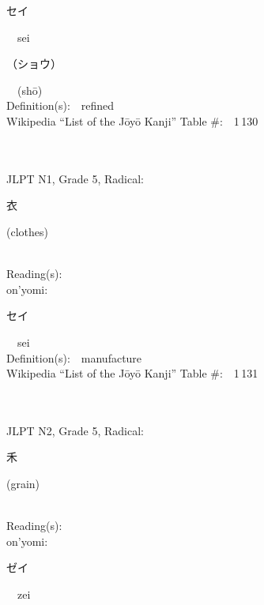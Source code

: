 \begin{multicols}{2}
{\hspace*{2em}}{\begin{CJK}{UTF8}{min} セイ \end{CJK}}\ \ sei\ \ \\
{\hspace*{2em}}{\begin{CJK}{UTF8}{min} （ショウ） \end{CJK}}\ \ (sh\=o)\ \ \\
Definition(s):\ \ refined \\
Wikipedia ``List of the J\=oy\=o Kanji'' Table \#:\ \ 1\,130 \\
\ \ \\
{\fontsize{34pt}{40pt}  }\ \ \\  %
{JLPT N1, Grade 5, Radical:\ \ {\begin{CJK}{UTF8}{min} 衣 \end{CJK}} (clothes) } \\
Reading(s):\ \ \\
{\hspace*{1em}}on'yomi:\ \ \\
{\hspace*{2em}}{\begin{CJK}{UTF8}{min} セイ \end{CJK}}\ \ sei\ \ \\
Definition(s):\ \ manufacture \\
Wikipedia ``List of the J\=oy\=o Kanji'' Table \#:\ \ 1\,131 \\
\ \ \\
{\fontsize{34pt}{40pt}  }\ \ \\  %
{JLPT N2, Grade 5, Radical:\ \ {\begin{CJK}{UTF8}{min} 禾 \end{CJK}} (grain) } \\
Reading(s):\ \ \\
{\hspace*{1em}}on'yomi:\ \ \\
{\hspace*{2em}}{\begin{CJK}{UTF8}{min} ゼイ \end{CJK}}\ \ zei\ \ \\

\end{multicols}

